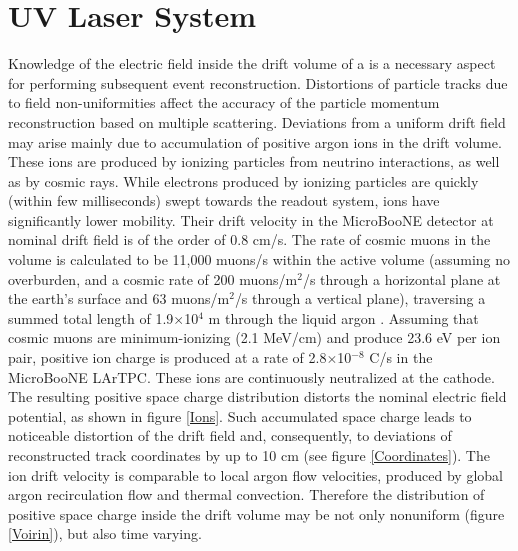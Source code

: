 \section{UV Laser System}
\label{sec:laser}

Knowledge of the electric field inside the drift volume of a \lartpc is a necessary aspect for performing subsequent event reconstruction. Distortions of particle tracks due to field non-uniformities affect the accuracy of the particle momentum reconstruction based on multiple scattering.  Deviations from a uniform drift field may arise mainly due to accumulation of positive argon ions in the drift volume. These ions are produced by ionizing particles from neutrino interactions, as well as by cosmic rays. While electrons produced by ionizing particles are quickly (within few milliseconds) swept towards the readout system, ions have significantly lower mobility. Their drift velocity in the MicroBooNE detector at nominal drift field is of the order of 0.8 cm/s. The rate of cosmic muons in the \lartpc volume is calculated to be 11,000 muons/s within the active volume (assuming no overburden, and a cosmic rate of 200 muons/m$^2$/s through a horizontal plane at the earth's surface and 63 muons/m$^2$/s through a vertical plane), traversing a summed total length of 1.9$\times$10$^4$ m through the liquid argon \cite{mcdonald1,mcdonald2}.  Assuming that cosmic muons are minimum-ionizing (2.1 MeV/cm) and produce 23.6 eV per ion pair, positive ion charge is produced at a rate of 2.8$\times$10$^{-8}$ C/s in the MicroBooNE LArTPC. These ions are continuously neutralized at the cathode. The resulting positive space charge distribution distorts the nominal \lartpc electric field potential, as shown in figure \ref{Ions}. Such accumulated space charge leads to noticeable distortion of the drift field and, consequently, to deviations of reconstructed track coordinates by up to 10 cm (see figure \ref{Coordinates}).  The ion drift velocity is comparable to local argon flow velocities, produced by global argon recirculation flow and thermal convection. Therefore the distribution of positive space charge inside the drift volume may be not only nonuniform (figure \ref{Voirin}), but also time varying.

